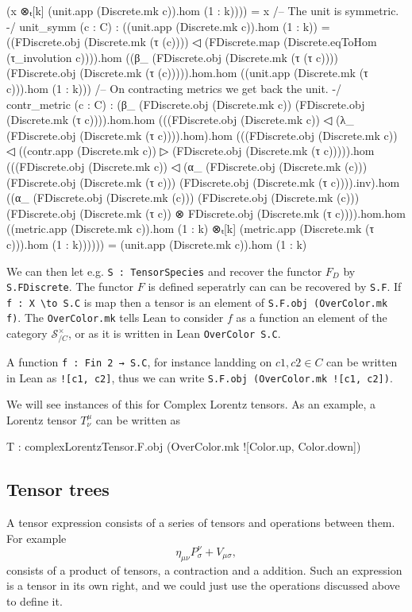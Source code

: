 \documentclass[a4paper, 11pt]{article}
\begin{document}
\begin{codeLong}
    (x ⊗ₜ[k] (unit.app (Discrete.mk c)).hom (1 : k)))) = x
  /-- The unit is symmetric. -/
  unit_symm (c : C) :
    ((unit.app (Discrete.mk c)).hom (1 : k)) =
    ((FDiscrete.obj (Discrete.mk (τ (c)))) ◁
      (FDiscrete.map (Discrete.eqToHom (τ_involution c)))).hom
    ((β_ (FDiscrete.obj (Discrete.mk (τ (τ c)))) (FDiscrete.obj (Discrete.mk (τ (c))))).hom.hom
    ((unit.app (Discrete.mk (τ c))).hom (1 : k)))
  /-- On contracting metrics we get back the unit. -/
  contr_metric (c : C) :
    (β_ (FDiscrete.obj (Discrete.mk c)) (FDiscrete.obj (Discrete.mk (τ c)))).hom.hom
    (((FDiscrete.obj (Discrete.mk c)) ◁ (λ_ (FDiscrete.obj (Discrete.mk (τ c)))).hom).hom
    (((FDiscrete.obj (Discrete.mk c)) ◁ ((contr.app (Discrete.mk c)) ▷
    (FDiscrete.obj (Discrete.mk (τ c))))).hom
    (((FDiscrete.obj (Discrete.mk c)) ◁ (α_ (FDiscrete.obj (Discrete.mk (c)))
      (FDiscrete.obj (Discrete.mk (τ c))) (FDiscrete.obj (Discrete.mk (τ c)))).inv).hom
    ((α_ (FDiscrete.obj (Discrete.mk (c))) (FDiscrete.obj (Discrete.mk (c)))
      (FDiscrete.obj (Discrete.mk (τ c)) ⊗ FDiscrete.obj (Discrete.mk (τ c)))).hom.hom
    ((metric.app (Discrete.mk c)).hom (1 : k) ⊗ₜ[k]
      (metric.app (Discrete.mk (τ c))).hom (1 : k))))))
    = (unit.app (Discrete.mk c)).hom (1 : k)
\end{codeLong}

We can then let e.g. \lstinline|S : TensorSpecies| and recover the functor $F_D$ 
by \lstinline|S.FDiscrete|. The functor $F$ is defined seperatrly can can be recovered
by \lstinline|S.F|. If \lstinline|f : X \to S.C| is map then a tensor is an element of 
\lstinline|S.F.obj (OverColor.mk f)|. The \lstinline|OverColor.mk| tells Lean to consider $f$ as 
a function an element of the category $\mathcal{S}_{/C}^\times$, or as it is written in Lean 
\lstinline|OverColor S.C|. 

A function \lstinline|f : Fin 2 → S.C|, for instance landding on $c1, c2 \in C$ can be written in 
Lean as \lstinline|![c1, c2]|, thus we can write \lstinline|S.F.obj (OverColor.mk ![c1, c2])|. 

We will see instances of this for Complex Lorentz tensors. As an example, a Lorentz tensor 
$T^\mu_\nu$ can be written as 
\begin{code}
T : complexLorentzTensor.F.obj (OverColor.mk ![Color.up, Color.down])
\end{code}

\subsection{Tensor trees}
A tensor expression consists of a series of tensors and operations between them. 
For example 
\begin{equation}
  \eta_{\mu \nu}P^\nu_\sigma+ V_{\mu \sigma},
\end{equation}
consists of a product of tensors, a contraction and a addition. 
Such an expression is a tensor in its own right, and we could just use the operations discussed above 
to define it. 
\end{document}
